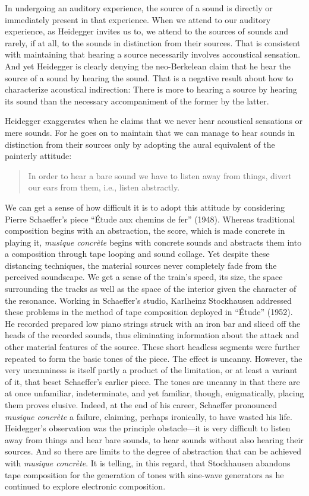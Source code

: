 In undergoing an auditory experience, the source of a sound is directly or immediately present in that experience. When we attend to our auditory experience, as Heidegger invites us to, we attend to the sources of sounds and rarely, if at all, to the sounds in distinction from their sources. That is consistent with maintaining that hearing a source necessarily involves accoustical sensation. And yet Heidegger is clearly denying the neo-Berkelean claim that he hear the source of a sound by hearing the sound. That is a negative result about how to characterize acoustical indirection: There is more to hearing a source by hearing its sound than the necessary accompaniment of the former by the latter.

Heidegger exaggerates when he claims that we never hear acoustical sensations or mere sounds. For he goes on to maintain that we can manage to hear sounds in distinction from their sources only by adopting the aural equivalent of the painterly attitude:
\begin{quote}
    In order to hear a bare sound we have to listen away from things, divert our ears from them, i.e., listen abstractly. \citep[152]{Heidegger:1935uq}
\end{quote}
We can get a sense of how difficult it is to adopt this attitude by considering Pierre Schaeffer's piece ``Étude aux chemins de fer'' (1948). Whereas traditional composition begins with an abstraction, the score, which is made concrete in playing it, \emph{musique concrète} begins with concrete sounds and abstracts them into a composition through tape looping and sound collage. Yet despite these distancing techniques, the material sources never completely fade from the perceived soundscape. We get a sense of the train's speed, its size, the space surrounding the tracks as well as the space of the interior given the character of the resonance. Working in Schaeffer's studio, Karlheinz Stockhausen addressed these problems in the method of tape composition deployed in ``Étude'' (1952). He recorded prepared low piano strings struck with an iron bar and sliced off the heads of the recorded sounds, thus eliminating information about the attack and other material features of the source. These short headless segments were further repeated to form the basic tones of the piece. The effect is uncanny. However, the very uncanniness is itself partly a product of the limitation, or at least a variant of it, that beset Schaeffer's earlier piece. The tones are uncanny in that there are at once unfamiliar, indeterminate, and yet familiar, though, enigmatically, placing them proves elusive. Indeed, at the end of his career, Schaeffer pronounced \emph{musique concrète} a failure, claiming, perhaps ironically, to have wasted his life. Heidegger's observation was the principle obstacle---it is very difficult to listen away from things and hear bare sounds, to hear sounds without also hearing their sources. And so there are limits to the degree of abstraction that can be achieved with \emph{musique concrète}. It is telling, in this regard, that Stockhausen abandons tape composition for the generation of tones with sine-wave generators as he continued to explore electronic composition.

